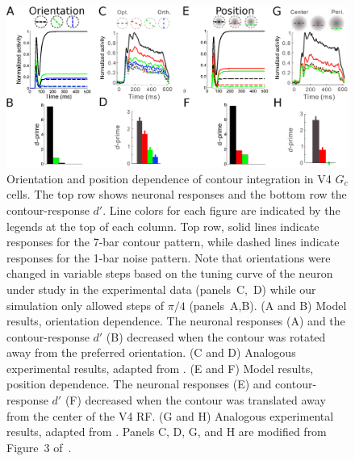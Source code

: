 \begin{figure}[h]
\begin{center}
\includegraphics[width=\textwidth]{Contour/figs/FigS1.eps}
\end{center}
\makeatletter
\let\@currsize\normalsize
\caption[Orientation and position dependence of contour integration in V4]{Orientation and position dependence of contour integration in
  V4 $G_c$ cells. The top row shows neuronal responses and the bottom
  row the contour-response $d'$.  Line colors for each figure are
  indicated by the legends at the top of each column. Top row, solid
  lines indicate responses for the 7-bar contour pattern, while dashed
  lines indicate responses for the 1-bar noise pattern.  Note that
  orientations were changed in variable steps based on the tuning
  curve of the neuron under study in the experimental data
  (panels~C,~D) while our simulation only allowed steps of
  $\pi/4$ (panels~A,B).  (A and B) Model results, orientation
  dependence.
 The neuronal responses (A) and the contour-response $d'$
  (B) decreased when the contour was rotated away from the preferred
  orientation. (C and D) Analogous experimental results, adapted from
  \cite{Chen_etal14}.
  (E and F) Model
  results, position dependence.
 The neuronal responses (E) and
  contour-response $d'$ (F) decreased when the contour was translated away from the center of the V4 RF.
  (G and H) Analogous experimental results, adapted from \cite{Chen_etal14}. Panels C, D, G, and H are modified from Figure~3 of~\cite{Chen_etal14}.}
\label{Fig:V4_total}
\end{figure}

